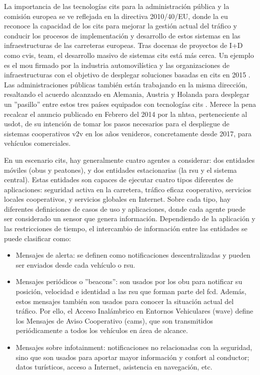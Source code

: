 La importancia de las tecnologías \gls{cits} para la administración pública y
la comisión europea se ve reflejada en la directiva 2010/40/EU, donde la
\gls{eu} reconoce la capacidad de los \gls{cits} para mejorar la gestión actual
del tráfico y conducir los procesos de implementación y desarrollo de estos
sistemas en las infraestructuras de las carreteras europeas. Tras docenas de
proyectos de I+D como \gls{cvis}, \gls{team}, el desarrollo masivo de sistemas
\gls{cits} está más cerca. Un ejemplo es el \gls{mou} firmado por la industria
automovilística y las organizaciones de infraestructuras con el objetivo de
desplegar soluciones basadas en \gls{cits} en 2015 \cite{c2c_consortium}. Las
administraciones públicas también están trabajando en la misma dirección,
resaltando el acuerdo alcanzado en Alemania, Austria y Holanda para desplegar
un ''pasillo'' entre estos tres países equipados con tecnologías \gls{cits}
\cite{amsterdam_group}. Merece la pena recalcar el anuncio publicado en Febrero
del 2014 por la \gls{nhtsa}, perteneciente al \gls{usdot}, de su intención de
tomar los pasos necesarios para el despliegue de sistemas cooperativos
\gls{v2v} en los años venideros, concretamente desde 2017, para vehículos
comerciales.

En un escenario \gls{cits}, hay generalmente cuatro agentes a considerar: dos
entidades móviles (\gls{obu}s y peatones), y dos entidades estacionarias (la
\gls{rsu} y el sistema central). Estas entidades son capaces de ejecutar cuatro
tipos diferentes de aplicaciones: seguridad activa en la carretera, tráfico
eficaz cooperativo, servicios locales cooperativos, y servicios globales en
Internet. Sobre cada tipo, hay diferentes definiciones de casos de uso y
aplicaciones, donde cada agente puede ser considerado un sensor que genera
información. Dependiendo de la aplicación y las restricciones de  tiempo, el
intercambio de información entre las entidades se puede clasificar como:

\begin{itemize}
	\item Mensajes de alerta: se definen como notificaciones descentralizadas y
	pueden ser enviados desde cada vehículo o \gls{rsu}.

	\item Mensajes periódicos o ''beacons'': son usados por los \gls{obu} para
	notificar su posición, velocidad e identidad a las \gls{rsu} que forman parte
	del \gls{fcd}. Además, estos mensajes también son usados para conocer la
	situación	actual del tráfico. Por ello, el Acceso Inalámbrico en Entornos
	Vehiculares (\gls{wave})	define los Mensajes de Aviso Cooperativo
	(\gls{cam}s), que son transmitidos periódicamente	a todos los vehículos en
	área de alcance.

	\item Mensajes sobre infotainment: notificaciones no relacionadas con la
	seguridad, sino que son usados para aportar mayor información y confort al
	conductor; datos turísticos, acceso a Internet, asistencia en navegación, etc.
\end{itemize}

